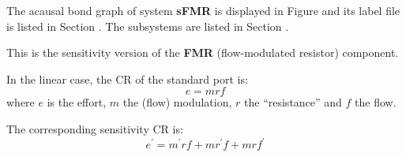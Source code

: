 

   The acausal bond graph of system \textbf{sFMR} is
   displayed in Figure  and its label
   file is listed in Section .
   The subsystems are listed in Section .


This is the sensitivity version of the \textbf{FMR} (flow-modulated
resistor) component.

In the linear case, the CR of the standard port is:
\begin{equation}
  e = mrf
\end{equation}
where $e$ is the effort, $m$ the (flow) modulation, $r$ the
``resistance'' and $f$ the flow.

The corresponding sensitivity CR is:
\begin{equation}
  e^\prime  = m^\prime rf + mr^\prime f + mrf^\prime
\end{equation}